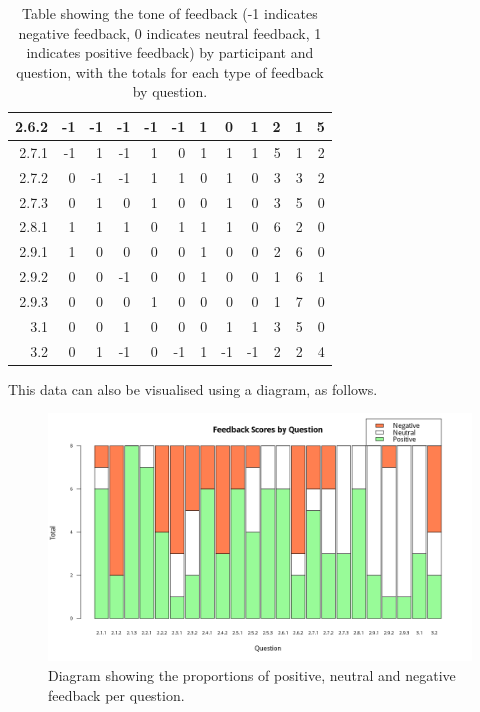 \documentclass[12pt,twoside,notitlepage,xetex]{report}
\begin{document}
\begin{center}
\begin{table}[H]
\begin{center}
\begin{tabular}{|r||r|r|r|r||r|r|r|r||r|r|r|}
2.6.2 & -1 & -1 & -1 & -1 & -1 & 1 & 0 & 1 & 2 & 1 & 5\\ \hline
2.7.1 & -1 & 1 & -1 & 1 & 0 & 1 & 1 & 1 & 5 & 1 & 2\\ \hline
2.7.2 & 0 & -1 & -1 & 1 & 1 & 0 & 1 & 0 & 3 & 3 & 2\\ \hline
2.7.3 & 0 & 1 & 0 & 1 & 0 & 0 & 1 & 0 & 3 & 5 & 0\\ \hline
2.8.1 & 1 & 1 & 1 & 0 & 1 & 1 & 1 & 0 & 6 & 2 & 0\\ \hline
2.9.1 & 1 & 0 & 0 & 0 & 0 & 1 & 0 & 0 & 2 & 6 & 0\\ \hline
2.9.2 & 0 & 0 & -1 & 0 & 0 & 1 & 0 & 0 & 1 & 6 & 1\\ \hline
2.9.3 & 0 & 0 & 0 & 1 & 0 & 0 & 0 & 0 & 1 & 7 & 0\\ \hline
3.1 & 0 & 0 & 1 & 0 & 0 & 0 & 1 & 1 & 3 & 5 & 0\\ \hline
3.2 & 0 & 1 & -1 & 0 & -1 & 1 & -1 & -1 & 2 & 2 & 4\\
\hline
\end{tabular}
\end{center}
\caption{Table showing the tone of feedback (-1 indicates negative feedback, 0 indicates neutral feedback, 1 indicates positive feedback) by participant and question, with the totals for each type of feedback by question.}
\label{tab:FeedbackScores}
\end{table}
\end{center}

This data can also be visualised using a diagram, as follows.

\begin{center}
\begin{figure}[H]
\begin{center}
\includegraphics[width=\textwidth]{figs/graphs/stacked-scores.png}
\end{center}
\caption{Diagram showing the proportions of positive, neutral and negative feedback per question.}
\label{fig:StackedScores}
\end{figure}
\end{center}
\end{document}
